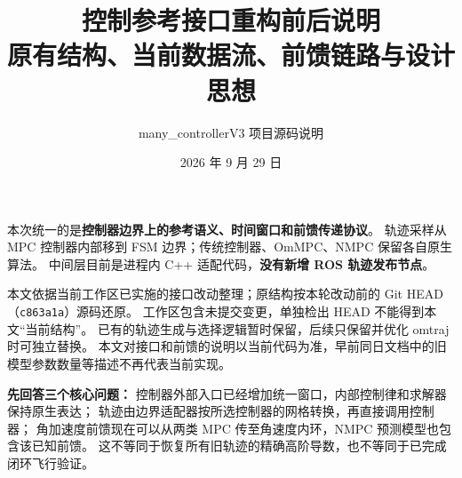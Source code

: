 \documentclass[UTF8,a4paper,11pt,fontset=fandol]{ctexart}
\title{\textbf{控制参考接口重构前后说明}\\[5pt]\large 原有结构、当前数据流、前馈链路与设计思想}
\author{many\_controllerV3 项目源码说明}\date{2026 年 9 月 29 日}
\newcommand{\code}[1]{{\small\nolinkurl{#1}}}
\newcommand{\note}[1]{\par\noindent\colorbox{panel}{\parbox{\dimexpr\linewidth-2\fboxsep}{#1}}\par}
\begin{document}
\maketitle
\note{本次统一的是\textbf{控制器边界上的参考语义、时间窗口和前馈传递协议}。
轨迹采样从 MPC 控制器内部移到 FSM 边界；传统控制器、OmMPC、NMPC 保留各自原生算法。
中间层目前是进程内 C++ 适配代码，\textbf{没有新增 ROS 轨迹发布节点}。}

本文依据当前工作区已实施的接口改动整理；原结构按本轮改动前的 Git HEAD（\code{c863a1a}）源码还原。
工作区包含未提交变更，单独检出 HEAD 不能得到本文“当前结构”。
已有的轨迹生成与选择逻辑暂时保留，后续只保留并优化 omtraj 时可独立替换。
本文对接口和前馈的说明以当前代码为准，早前同日文档中的旧模型参数数量等描述不再代表当前实现。

\textbf{先回答三个核心问题：}
控制器外部入口已经增加统一窗口，内部控制律和求解器保持原生表达；
轨迹由边界适配器按所选控制器的网格转换，再直接调用控制器；
角加速度前馈现在可以从两类 MPC 传至角速度内环，NMPC 预测模型也包含该已知前馈。
这不等同于恢复所有旧轨迹的精确高阶导数，也不等同于已完成闭环飞行验证。

{\small\setlength{\parskip}{0pt}\tableofcontents}
\clearpage
\end{document}
